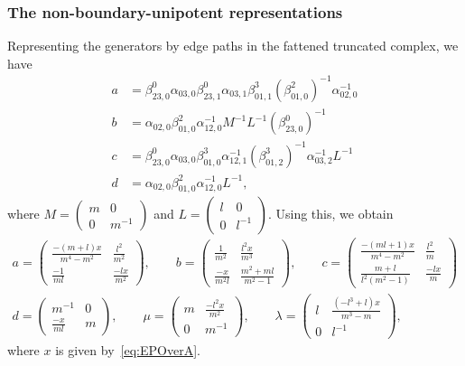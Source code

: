 \documentclass[11pt]{amsart}
\theoremstyle{plain}
\theoremstyle{definition}
\numberwithin{equation}{section}
\newcommand{\Matrix}[4]{\left(\begin{smallmatrix}#1&#2\\#3&#4\end{smallmatrix}\right)}
\begin{document}
\subsubsection{The non-boundary-unipotent representations}\label{sub:TautologicalRep}
Representing the generators by edge paths in the fattened truncated complex, we have
\begin{equation}
\begin{aligned}
a&=\beta^0_{23,0}\alpha_{03,0}\beta^0_{23,1}\alpha_{03,1}\beta^3_{01,1}(\beta^2_{01,0})^{-1}\alpha_{02,0}^{-1}\\
b&=\alpha_{02,0}\beta^2_{01,0}\alpha_{12,0}^{-1}M^{-1}L^{-1}(\beta^0_{23,0})^{-1}\\
c&=\beta^0_{23,0}\alpha_{03,0}\beta^3_{01,0}\alpha_{12,1}^{-1}(\beta^3_{01,2})^{-1}\alpha_{03,2}^{-1}L^{-1}\\
d&=\alpha_{02,0}\beta^2_{01,0}\alpha_{12,0}^{-1}L^{-1},
\end{aligned}
\end{equation}
where $M=\Matrix{m}{0}{0}{m^{-1}}$ and $L=\Matrix{l}{0}{0}{l^{-1}}$. Using this, we obtain
\begin{equation}
\begin{gathered}
a=\begin{pmatrix}\frac{-(m+l)x}{m^4-m^2}&\frac{l^2}{m^2}\\\frac{-1}{ml}&\frac{-lx}{m^2}\end{pmatrix},\qquad b=\begin{pmatrix}\frac{1}{m^2}&\frac{l^2x}{m^3}\\\frac{-x}{m^2l}&\frac{m^2+ml}{m^2-1}\end{pmatrix},\qquad c=\begin{pmatrix}\frac{-(ml+1)x}{m^4-m^2}&\frac{l^2}{m}\\\frac{m+l}{l^2(m^2-1)}&\frac{-lx}{m}\end{pmatrix}\\
d=\begin{pmatrix}m^{-1}&0\\\frac{-x}{ml}&m\end{pmatrix},\qquad \mu=\begin{pmatrix}m&\frac{-l^2x}{m^2}\\0&m^{-1}\end{pmatrix},\qquad \lambda=\begin{pmatrix}l&\frac{(-l^3+l)x}{m^3-m}\\0&l^{-1}\end{pmatrix},
\end{gathered}
\end{equation}
where $x$ is given by~\eqref{eq:EPOverA}.
\end{document}
